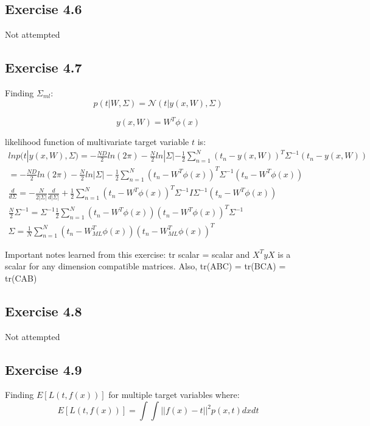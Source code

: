 \subsection{Exercise 4.6}
Not attempted

\subsection{Exercise 4.7}
Finding $\Sigma_{ml}$:
\begin{equation}
  p(t|W,\Sigma) = \mathcal{N}(t|y(x,W), \Sigma)
\end{equation}

\begin{equation}
  y(x,W) = W^T \phi(x)
\end{equation}

likelihood function of multivariate target variable $t$ is:
\begin{gather}
  ln p(t|y(x,W),\Sigma) = -\frac{ND}{2} ln(2\pi) - \frac{N}{2} ln|\Sigma| - \frac{1}{2} \sum_{n=1}^{N} (t_n - y(x,W))^T\Sigma^{-1} (t_n - y(x,W)) \\
  = -\frac{ND}{2} ln(2\pi) - \frac{N}{2} ln|\Sigma| - \frac{1}{2} \sum_{n=1}^{N} (t_n - W^T \phi(x))^T\Sigma^{-1} (t_n - W^T \phi(x)) \\
  \frac{d}{d\Sigma} = -\frac{N}{2|\Sigma|} \frac{d}{d|\Sigma|} + \frac{1}{2}\sum_{n=1}^{N} (t_n - W^T \phi(x))^T\Sigma^{-1} I \Sigma^{-1} (t_n - W^T \phi(x)) \\
  \frac{N}{2} \Sigma^{-1} = \Sigma^{-1} \frac{1}{2}\sum_{n=1}^{N} (t_n - W^T \phi(x)) (t_n - W^T \phi(x))^T \Sigma^{-1} \\
  \Sigma = \frac{1}{N}\sum_{n=1}^{N} (t_n - W_{ML}^T \phi(x)) (t_n - W_{ML}^T \phi(x))^T
\end{gather}

Important notes learned from this exercise: tr scalar = scalar and $X^T y X$ is a scalar for any dimension compatible matrices. Also, tr(ABC) = tr(BCA) = tr(CAB)

\subsection{Exercise 4.8}
Not attempted

\subsection{Exercise 4.9}
Finding $E[L(t,f(x))]$ for multiple target variables where:
\begin{equation}
  E[L(t,f(x))] = \int \int ||f(x) - t||^2 p(x,t)dxdt
\end{equation}

